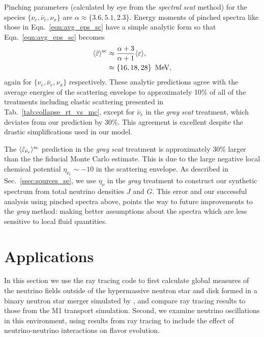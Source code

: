 \documentclass[aps,floatfix,prd,superscriptaddress,twocolumn]{revtex4-1}
\begin{document}
Pinching parameters
(calculated by eye from the \emph{spectral} \emph{scat} method)
for the species
$\{\nu_e,\bar{\nu}_e,\nu_x\}$ are $\alpha\approx\{3.6,5.1,2.3\}$.
Energy moments of pinched spectra like those in Eqn.~\ref{eqn:avg_eps_sc}
have a simple analytic form so that Eqn.~\ref{eqn:avg_eps_sc} becomes
\begin{align}
  \label{eqn:pinched_avg_eps_sc_1}
  \langle\tilde{\varepsilon}\rangle^{\rm sc}
  &\approx \frac{\alpha+3}{\alpha+1} \langle\varepsilon\rangle, \\
  \label{eqn:pinched_avg_eps_sc_3}
  &\approx \{16,18,28\}\,~{\rm MeV},
\end{align}
again for $\{\nu_e,\bar{\nu}_e,\nu_x\}$ respectively.
These analytic predictions agree with the average energies of the scattering
envelope to approximately 10\%
of all of the treatments including elastic scattering presented
in Tab.~\ref{tab:collapse_rt_vs_mc}, except for
$\bar{\nu}_e$ in the \emph{gray} \emph{scat} treatment,
which deviates from our prediction by 30\%.
This agreement is excellent despite the drastic
simplifications used in our model.

The $\langle\tilde{\varepsilon}_{\bar{\nu}_e}\rangle^{\rm sc}$ prediction
in the \emph{gray} \emph{scat} treatment is approximately 30\%
larger than the the fiducial Monte Carlo estimate. This is
due to the large negative local chemical potential
$\eta_{\bar{\nu}_e}\sim-10$ in the scattering envelope.
As described in Sec.~\ref{ssec:sources_se},
we use $\eta_\nu$ in the \emph{gray} treatment to construct our
synthetic spectrum from total neutrino densities $J$ and $G$.
This error and our successful analysis using pinched spectra above,
points the way to future improvements to the \emph{gray} method:
making better assumptions about the spectra which are less sensitive
to local fluid quantities.

\section{Applications}
\label{sec:applications}

In this section we use the ray tracing code to
first calculate global measures
of the neutrino fields outside of the hypermassive neutron star and disk
formed in a binary neutron star merger simulated by
\cite{fouc2016-m1_nsns, fouc2016-m1_evolve_n},
and compare ray tracing results to those from the M1 transport simulation.
Second, we examine neutrino oscillations in this environment,
using results from ray tracing to include the effect of neutrino-neutrino
interactions on flavor evolution.
\end{document}
